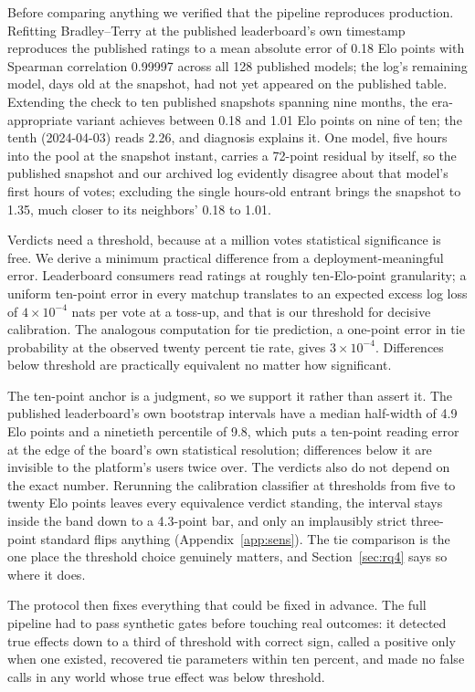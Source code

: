 \documentclass[10pt]{article}
\begin{document}
Before comparing anything we verified that the pipeline reproduces
production. Refitting Bradley--Terry at the published leaderboard's
own timestamp reproduces the published ratings to a mean absolute
error of 0.18 Elo points with Spearman correlation 0.99997 across all
128 published models; the log's remaining model, days old at the
snapshot, had not yet appeared on the published table. Extending the check to ten published snapshots
spanning nine months, the era-appropriate variant achieves between
0.18 and 1.01 Elo points on nine of ten; the tenth (2024-04-03) reads
2.26, and diagnosis explains it. One model, five hours into the pool
at the snapshot instant, carries a 72-point residual by itself, so the
published snapshot and our archived log evidently disagree about that
model's first hours of votes; excluding the single hours-old entrant
brings the snapshot to 1.35, much closer to its neighbors' 0.18 to
1.01.

Verdicts need a threshold, because at a million votes statistical
significance is free. We derive a minimum practical difference from a
deployment-meaningful error. Leaderboard consumers read ratings at
roughly ten-Elo-point granularity; a uniform ten-point error in every
matchup translates to an expected excess log loss of $4 \times
10^{-4}$ nats per vote at a toss-up, and that is our threshold for
decisive calibration. The analogous computation for tie prediction,
a one-point error in tie probability at the observed twenty percent
tie rate, gives $3 \times 10^{-4}$. Differences below threshold are
practically equivalent no matter how significant.

The ten-point anchor is a judgment, so we support it rather than
assert it. The published leaderboard's own bootstrap intervals have a
median half-width of 4.9 Elo points and a ninetieth percentile of 9.8,
which puts a ten-point reading error at the edge of the board's own
statistical resolution; differences below it are invisible to the
platform's users twice over. The verdicts also do not depend on the
exact number. Rerunning the calibration classifier at thresholds from
five to twenty Elo points leaves every equivalence verdict standing,
the interval stays inside the band down to a 4.3-point bar, and only
an implausibly strict three-point standard flips anything
(Appendix~\ref{app:sens}). The tie comparison is the one place the
threshold choice genuinely matters, and Section~\ref{sec:rq4} says so
where it does.

The protocol then fixes everything that could be fixed in advance.
The full pipeline had to pass synthetic gates before touching real
outcomes: it detected true effects down to a third of threshold with
correct sign, called a positive only when one existed, recovered tie
parameters within ten percent, and made no false calls in any world
whose true effect was below threshold.
\end{document}
